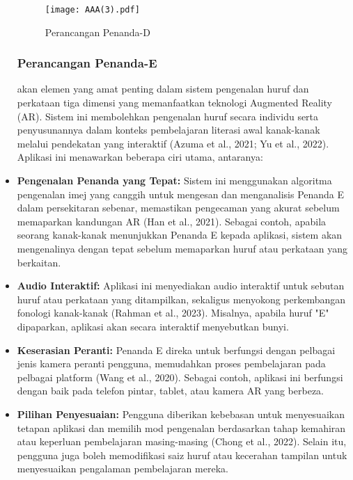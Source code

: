 \begin{itemize}
\begin{figure}
    \centering
    \texttt{[image: AAA(3).pdf]}
    \caption{Perancangan Penanda-D}
    \label{fig:D}
\end{figure}
\clearpage
\subsubsection{Perancangan Penanda-E}

akan elemen yang amat penting dalam sistem pengenalan huruf dan perkataan tiga dimensi yang memanfaatkan teknologi Augmented Reality (AR). Sistem ini membolehkan pengenalan huruf secara individu serta penyusunannya dalam konteks pembelajaran literasi awal kanak-kanak melalui pendekatan yang interaktif (Azuma et al., 2021; Yu et al., 2022). Aplikasi ini menawarkan beberapa ciri utama, antaranya:  \\  
 
\item \textbf{Pengenalan Penanda yang Tepat:} Sistem ini menggunakan algoritma pengenalan imej yang canggih untuk mengesan dan menganalisis Penanda E dalam persekitaran sebenar, memastikan pengecaman yang akurat sebelum memaparkan kandungan AR (Han et al., 2021). Sebagai contoh, apabila seorang kanak-kanak menunjukkan Penanda E kepada aplikasi, sistem akan mengenalinya dengan tepat sebelum memaparkan huruf atau perkataan yang berkaitan.\\  
\item \textbf{Audio Interaktif:} Aplikasi ini menyediakan audio interaktif untuk sebutan huruf atau perkataan yang ditampilkan, sekaligus menyokong perkembangan fonologi kanak-kanak (Rahman et al., 2023). Misalnya, apabila huruf "E" dipaparkan, aplikasi akan secara interaktif menyebutkan bunyi.\\  
\item \textbf{Keserasian Peranti:} Penanda E direka untuk berfungsi dengan pelbagai jenis kamera peranti pengguna, memudahkan proses pembelajaran pada pelbagai platform (Wang et al., 2020). Sebagai contoh, aplikasi ini berfungsi dengan baik pada telefon pintar, tablet, atau kamera AR yang berbeza.\\  
\item \textbf{Pilihan Penyesuaian:} Pengguna diberikan kebebasan untuk menyesuaikan tetapan aplikasi dan memilih mod pengenalan berdasarkan tahap kemahiran atau keperluan pembelajaran masing-masing (Chong et al., 2022). Selain itu, pengguna juga boleh memodifikasi saiz huruf atau kecerahan tampilan untuk menyesuaikan pengalaman pembelajaran mereka.\\  


\end{itemize}

